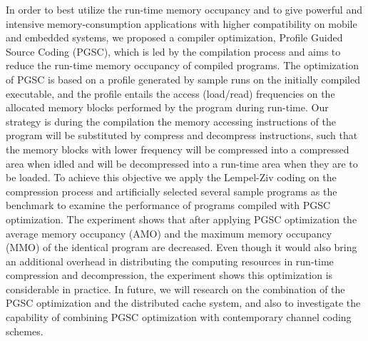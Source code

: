 \documentclass[11pt,conference,final,onecolumn]{IEEEtran}
\begin{document}
In order to best utilize the run-time memory occupancy and to give powerful and intensive memory-consumption applications with higher compatibility on mobile and embedded systems, we proposed a compiler optimization, Profile Guided Source Coding (PGSC), which is led by the compilation process and aims to reduce the run-time memory occupancy of compiled programs. The optimization of PGSC is based on a profile generated by sample runs on the initially compiled executable, and the profile entails the access (load/read) frequencies on the allocated memory blocks performed by the program during run-time. Our strategy is during the compilation the memory accessing instructions of the program will be substituted by compress and decompress instructions, such that the memory blocks with lower frequency will be compressed into a compressed area when idled and will be decompressed into a run-time area when they are to be loaded. To achieve this objective we apply the Lempel-Ziv coding on the compression process and artificially selected several sample programs as the benchmark to examine the performance of programs compiled with PGSC optimization. The experiment shows that after applying PGSC optimization the average memory occupancy (AMO) and the maximum memory occupancy (MMO) of the identical program are decreased. Even though it would also bring an additional overhead in distributing the computing resources in run-time compression and decompression, the experiment shows this optimization is considerable in practice. In future, we will research on the combination of the PGSC optimization and the distributed cache system, and also to investigate the capability of combining PGSC optimization with contemporary channel coding schemes. 




%
%
%
%
\end{document}
